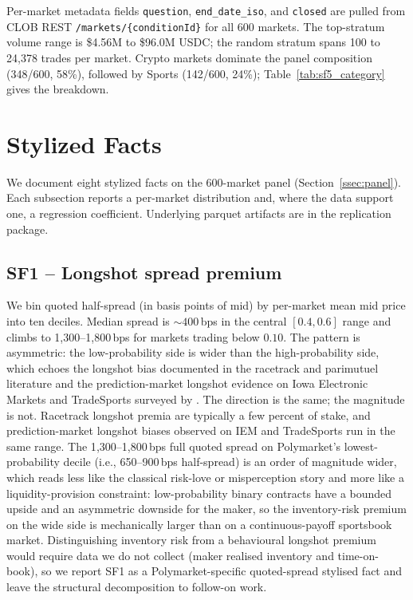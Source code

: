 \documentclass[11pt,a4paper,twocolumn]{article}
\begin{document}
Per-market metadata fields
\texttt{question},
\texttt{end\_date\_iso},
and \texttt{closed}
are pulled from CLOB REST
\texttt{/markets/\allowbreak\{conditionId\}}
for all 600 markets. The top-stratum
volume range is \$4.56M to \$96.0M USDC; the random stratum spans
100 to 24{,}378 trades per market. Crypto markets dominate the panel
composition (348/600, 58\%), followed by Sports (142/600, 24\%);
Table~\ref{tab:sf5_category} gives the breakdown.
\section{Stylized Facts}\label{sec:sf}

We document eight stylized facts on the 600-market panel
(Section~\ref{ssec:panel}). Each subsection reports a per-market
distribution and, where the data support one, a regression coefficient.
Underlying parquet artifacts are in the replication package.

\subsection{SF1 -- Longshot spread premium}\label{ssec:sf1}

We bin quoted half-spread (in basis points of mid) by per-market mean
mid price into ten deciles. Median spread is $\sim 400$\,bps in the
central $[0.4, 0.6]$ range and climbs to 1{,}300--1{,}800\,bps for
markets trading below $0.10$. The pattern is asymmetric: the
low-probability side is wider than the high-probability side, which
echoes the longshot bias documented in the racetrack and parimutuel
literature \citep{snowberg-wolfers-2010,thaler-ziemba-1988} and the
prediction-market longshot evidence on Iowa Electronic Markets and
TradeSports surveyed by \citet{wolfers-zitzewitz-2004}. The direction
is the same; the magnitude is not. Racetrack longshot premia are
typically a few percent of stake, and prediction-market longshot
biases observed on IEM and TradeSports run in the same range. The
1{,}300--1{,}800\,bps full quoted spread on Polymarket's lowest-
probability decile (i.e., 650--900\,bps half-spread) is an order
of magnitude wider, which reads less like the classical risk-love
or misperception story and more like a liquidity-provision
constraint: low-probability binary contracts
have a bounded upside and an asymmetric downside for the maker, so
the inventory-risk premium on the wide side is mechanically larger
than on a continuous-payoff sportsbook market. Distinguishing
inventory risk from a behavioural longshot premium would require
data we do not collect (maker realised inventory and time-on-book),
so we report SF1 as a Polymarket-specific quoted-spread stylised
fact and leave the structural decomposition to follow-on work.
\end{document}
